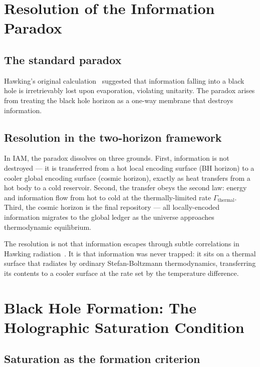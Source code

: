 \documentclass[12pt,a4paper]{article}
\begin{document}
\section{Resolution of the Information Paradox}

\subsection{The standard paradox}

Hawking's original calculation~\citep{Hawking1975} suggested that information
falling into a black hole is irretrievably lost upon evaporation, violating
unitarity. The paradox arises from treating the black hole horizon as a one-way
membrane that destroys information.

\subsection{Resolution in the two-horizon framework}

In IAM, the paradox dissolves on three grounds. First, information is not
destroyed --- it is transferred from a hot local encoding surface (BH horizon)
to a cooler global encoding surface (cosmic horizon), exactly as heat transfers
from a hot body to a cold reservoir. Second, the transfer obeys the second law:
energy and information flow from hot to cold at the thermally-limited rate
$\Gamma_\mathrm{thermal}$. Third, the cosmic horizon is the final repository ---
all locally-encoded information migrates to the global ledger as the universe
approaches thermodynamic equilibrium.

The resolution is not that information escapes through subtle correlations in
Hawking radiation~\citep{Page1993}. It is that information was never trapped: it
sits on a thermal surface that radiates by ordinary Stefan-Boltzmann
thermodynamics, transferring its contents to a cooler surface at the rate set by
the temperature difference.

\section{Black Hole Formation: The Holographic Saturation Condition}

\subsection{Saturation as the formation criterion}
\end{document}
